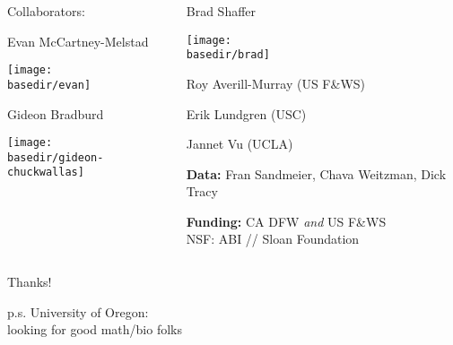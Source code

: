 \documentclass{beamer}
\newcommand{\basedir}{files}
\begin{document}
\begin{frame}{}

  \begin{columns}[c]
    \begin{column}{.4\textwidth}
      \begin{center}
        {\struct Collaborators:}

          {Evan McCartney-Melstad}

          \texttt{[image: \\basedir/evan]}

      {Gideon Bradburd}

          \texttt{[image: \\basedir/gideon-chuckwallas]}

      \end{center}
    \end{column}
    \begin{column}{.6\textwidth}

        \vspace{-2em}
      {Brad Shaffer}

        \texttt{[image: \\basedir/brad]}

        Roy Averill-Murray (US F\&WS)

        Erik Lundgren (USC)
      \vspace{0.5em}

        Jannet Vu (UCLA)
      \vspace{0.5em}

      \textbf{Data:}
      Fran Sandmeier, Chava Weitzman, Dick Tracy
      \vspace{0.5em}

      \textbf{Funding:}
        CA DFW \textit{and} US F\&WS \\
      NSF: ABI // 
      Sloan Foundation

    \end{column}
  \end{columns}

\end{frame}

\begin{frame}{ }

    \centering
    \vfill

    \Large Thanks!

    \vfill

    p.s. University of Oregon: \\
    looking for good math/bio folks

\end{frame}
\end{document}
